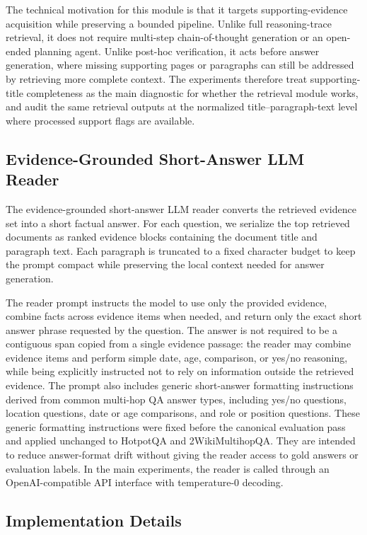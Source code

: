 The technical motivation for this module is that it targets supporting-evidence acquisition while preserving a bounded pipeline. Unlike full reasoning-trace retrieval, it does not require multi-step chain-of-thought generation or an open-ended planning agent. Unlike post-hoc verification, it acts before answer generation, where missing supporting pages or paragraphs can still be addressed by retrieving more complete context. The experiments therefore treat supporting-title completeness as the main diagnostic for whether the retrieval module works, and audit the same retrieval outputs at the normalized title--paragraph-text level where processed support flags are available.

\subsection{Evidence-Grounded Short-Answer LLM Reader}
\label{sec:short_answer_reader}

The evidence-grounded short-answer LLM reader converts the retrieved evidence set into a short factual answer. For each question, we serialize the top retrieved documents as ranked evidence blocks containing the document title and paragraph text. Each paragraph is truncated to a fixed character budget to keep the prompt compact while preserving the local context needed for answer generation.

The reader prompt instructs the model to use only the provided evidence, combine facts across evidence items when needed, and return only the exact short answer phrase requested by the question. The answer is not required to be a contiguous span copied from a single evidence passage: the reader may combine evidence items and perform simple date, age, comparison, or yes/no reasoning, while being explicitly instructed not to rely on information outside the retrieved evidence. The prompt also includes generic short-answer formatting instructions derived from common multi-hop QA answer types, including yes/no questions, location questions, date or age comparisons, and role or position questions. These generic formatting instructions were fixed before the canonical evaluation pass and applied unchanged to HotpotQA and 2WikiMultihopQA. They are intended to reduce answer-format drift without giving the reader access to gold answers or evaluation labels. In the main experiments, the reader is called through an OpenAI-compatible API interface with temperature-0 decoding.

\subsection{Implementation Details}
\label{sec:implementation_boundary}

